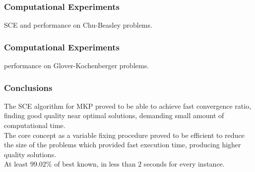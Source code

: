 \begin{frame}
\frametitle{Computational Experiments}
SCE and \scecore  performance on Chu-Beasley problems.
\begin{table}[hb]
{
\renewcommand{\arraystretch}{0.7}%
\fontsize{4.5pt}{1em}\selectfont
\begin{center}
  
\end{center}
}
\end{table}
\end{frame}

\begin{frame}
\frametitle{Computational Experiments}
\scecore performance on Glover-Kochenberger problems.
\begin{table}[hb]
  {
  \renewcommand{\arraystretch}{1}%
  \fontsize{5.5pt}{1em}\selectfont
  \begin{center}
    
  \end{center}
  }
\end{table}
\end{frame}

\begin{frame}
\frametitle{Conclusions}
The SCE algorithm for MKP proved to be able to achieve fast
convergence ratio, finding good quality near optimal solutions, demanding small
amount of computational time.
\\ \medskip \pause
The core concept as a variable fixing procedure
proved to be efficient to reduce the size of the problems which provided fast
execution time, producing higher quality solutions.
\\ \medskip \pause
At least $99.02\%$ of best known, in less than $2$ seconds for every instance.
\end{frame}
